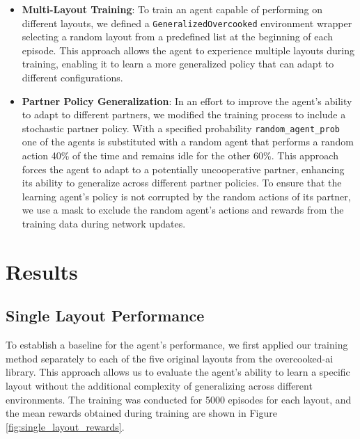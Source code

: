 \documentclass{article}
\begin{document}
\begin{itemize}
  \item \textbf{Multi-Layout Training}: To train an agent capable of performing on different layouts, we defined a \texttt{GeneralizedOvercooked} environment wrapper selecting a random layout from a predefined list at the beginning of each episode. This approach allows the agent to experience multiple layouts during training, enabling it to learn a more generalized policy that can adapt to different configurations.
  
  \item \textbf{Partner Policy Generalization}: In an effort to improve the agent's ability to adapt to different partners, we modified the training process to include a stochastic partner policy. With a specified probability \texttt{random\_agent\_prob} one of the agents is substituted with a random agent that performs a random action 40\% of the time and remains idle for the other 60\%. This approach forces the agent to adapt to a potentially uncooperative partner, enhancing its ability to generalize across different partner policies. To ensure that the learning agent's policy is not corrupted by the random actions of its partner, we use a mask to exclude the random agent's actions and rewards from the training data during network updates.
\end{itemize}

\section{Results}

\subsection{Single Layout Performance}
To establish a baseline for the agent's performance, we first applied our training method separately to each of the five original layouts from the overcooked-ai library. This approach allows us to evaluate the agent's ability to learn a specific layout without the additional complexity of generalizing across different environments. The training was conducted for 5000 episodes for each layout, and the mean rewards obtained during training are shown in Figure \ref{fig:single_layout_rewards}.
\end{document}
